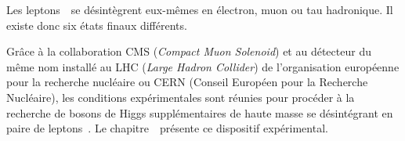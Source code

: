 Les leptons~\tau\ se désintègrent eux-mêmes en électron, muon ou tau hadronique.
Il existe donc six états finaux différents.
\par Grâce à la collaboration CMS (\emph{Compact Muon Solenoid}) et au détecteur du même nom installé au LHC (\emph{Large Hadron Collider}) de l'organisation européenne pour la recherche nucléaire ou CERN (Conseil Européen pour la Recherche Nucléaire), les conditions expérimentales sont réunies pour procéder à la
recherche de bosons de Higgs supplémentaires de haute masse se désintégrant en paire de leptons~\tau.
Le chapitre~\ présente ce dispositif expérimental.